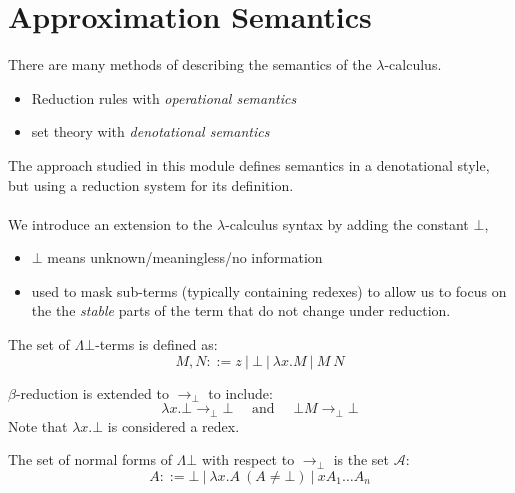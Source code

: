 \section{Approximation Semantics}
There are many methods of describing the semantics of the $\lambda$-calculus.
\begin{itemize}
    \item Reduction rules with \textit{operational semantics}
    \item set theory with \textit{denotational semantics}
\end{itemize}
The approach studied in this module defines semantics in a denotational style, but using a reduction system for its definition.
\\
\\ We introduce an extension to the $\lambda$-calculus syntax by adding the constant $\bot$,
\begin{itemize}
    \item $\bot$ means unknown/meaningless/no information
    \item used to mask sub-terms (typically containing redexes) to allow us to focus on the the \textit{stable} parts of the term that do not change under reduction.
\end{itemize}
The set of $\Lambda\bot$-terms is defined as:
\[M, N ::= z \ | \ \bot \ | \ \lambda x . M \ | \ M \ N\]
\begin{minipage}[t]{.37\textwidth}
    $\beta$-reduction is extended to $\to_\bot$ to include:
    \[\lambda x . \bot \to_\bot \bot \quad \text{ and } \quad \bot M \to_\bot \bot\]
    Note that $\lambda x. \bot$ is considered a redex.
\end{minipage}
\hfill
\vline
\hfill
\begin{minipage}[t]{.6\textwidth}
    The set of normal forms of $\Lambda\bot$ with respect to $\to_\bot$ is the set $\mathcal{A}$:
    \[A ::= \bot \ | \ \lambda x. A \ (A \neq \bot) \ | \ x A_1 \dots A_n\]    
\end{minipage}

